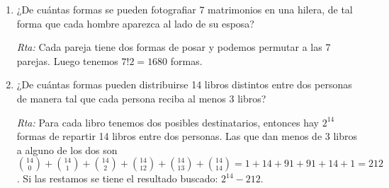 \documentclass[12pt,spanish,makeidx]{amsbook}
\begin{document}
\begin{enumerate}
\medskip

\item ¿De cuántas formas se pueden fotografiar 7 matrimonios en una hilera, de tal forma
que cada hombre aparezca al lado de su esposa?

\noindent\textit{Rta:} Cada pareja tiene dos formas de posar y podemos permutar a las 7 parejas. Luego tenemos $7!2=1680$ formas.

\medskip

\item ¿De cuántas formas pueden distribuirse 14 libros distintos entre dos personas de
manera tal que cada persona reciba al menos 3 libros?

\noindent\textit{Rta:} Para cada libro tenemos dos posibles destinatarios, entonces hay $2^{14}$ formas de repartir 14 libros entre dos personas.  Las que dan menos de 3 libros a alguno de los dos son $\binom{14}{0}+\binom{14}{1}+\binom{14}{2}+\binom{14}{12}+\binom{14}{13}+\binom{14}{14}=1+14+91+91+14+1=212$. Si las restamos se tiene el resultado buscado: $2^{14}-212$.

\end{enumerate}
\end{document}
